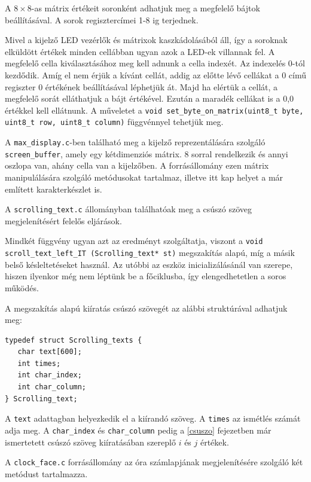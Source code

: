\documentclass[a4paper, 12pt]{article}
\begin{document}
A $8\times 8$-as mátrix értékeit soronként adhatjuk meg a megfelelő bájtok beállításával. A sorok regisztercímei 1-8 ig terjednek.

Mivel a kijelző LED vezérlők és mátrixok kaszkádolásából áll, így a soroknak elküldött értékek minden cellábban ugyan azok a LED-ek villannak fel. A megfelelő cella kiválasztásához meg kell adnunk a cella indexét. Az indexelés 0-tól kezdődik. Amíg el nem érjük a kívánt cellát, addig az előtte lévő cellákat a 0 című regiszter 0 értékének beállításával léphetjük át. Majd ha elértük a cellát, a megfelelő sorát elláthatjuk a bájt értékével. Ezután a maradék cellákat is a 0,0 értékkel kell ellátnunk. A műveletet a \texttt{void set\_byte\_on\_matrix(uint8\_t byte, uint8\_t row, uint8\_t column)} függvénnyel tehetjük meg.

\bigskip

A \texttt{max\_display.c}-ben található meg a kijelző reprezentálására szolgáló \texttt{screen\_buffer}, amely egy kétdimenziós mátrix. 8 sorral rendelkezik és annyi oszlopa van, ahány cella van a kijelzőben.
A forrásállomány ezen mátrix manipulálására szolgáló metódusokat tartalmaz, illetve itt kap helyet a már említett karakterkészlet is.

\bigskip

A \texttt{scrolling\_text.c} állományban találhatóak meg a csúszó szöveg megjelenítésért felelős eljárások.

\noindent Mindkét függvény ugyan azt az eredményt szolgáltatja, viszont a \texttt{void scroll\_text\_left\_IT (Scrolling\_text* st)} megszakítás alapú, míg a másik belső késleltetéseket használ. Az utóbbi az eszköz inicializálásánál van szerepe, hiszen ilyenkor még nem léptünk be a főciklusba, így elengedhetetlen a soros működés.

A megszakítás alapú kiíratás csúszó szövegét az alábbi struktúrával adhatjuk meg:
\begin{lstlisting}[style=CStyle]
typedef struct Scrolling_texts {
   char text[600];
   int times;
   int char_index;
   int char_column;
} Scrolling_text;
\end{lstlisting}
A \texttt{text} adattagban helyezkedik el a kiírandó szöveg. A \texttt{times} az ismétlés számát adja meg. A \texttt{char\_index} és \texttt{char\_column} pedig a \ref{csuszo} fejezetben már ismertetett csúszó szöveg kiíratásában szereplő $i$ és $j$ értékek. 

\bigskip

A \texttt{clock\_face.c} forrásállomány az óra számlapjának megjelenítésére szolgáló két metódust tartalmazza.
\end{document}
